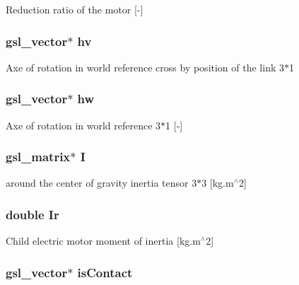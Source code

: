 Reduction ratio of the motor \mbox{[}-\/\mbox{]} \hypertarget{struct_stu_l_i_n_k_a047b5818b1f61a1ae7cf4b367fb2a351}{
\subsubsection[{hv}]{\setlength{\rightskip}{0pt plus 5cm}gsl\-\_\-vector$\ast$ hv}}\label{struct_stu_l_i_n_k_a047b5818b1f61a1ae7cf4b367fb2a351}
Axe of rotation in world reference cross by position of the link 3$\ast$1 \hypertarget{struct_stu_l_i_n_k_ad5b22cc091d474f9a72b98483e532d8a}{
\subsubsection[{hw}]{\setlength{\rightskip}{0pt plus 5cm}gsl\-\_\-vector$\ast$ hw}}\label{struct_stu_l_i_n_k_ad5b22cc091d474f9a72b98483e532d8a}
Axe of rotation in world reference 3$\ast$1 \mbox{[}-\/\mbox{]} \hypertarget{struct_stu_l_i_n_k_a20c577c90b1d497258ed3540242429f4}{
\subsubsection[{I}]{\setlength{\rightskip}{0pt plus 5cm}gsl\-\_\-matrix$\ast$ I}}\label{struct_stu_l_i_n_k_a20c577c90b1d497258ed3540242429f4}
around the center of gravity inertia tensor 3$\ast$3 \mbox{[}kg.\-m$^\wedge$2\mbox{]} \hypertarget{struct_stu_l_i_n_k_af889caeb9a167f251e3d0a7b5730eda3}{
\subsubsection[{Ir}]{\setlength{\rightskip}{0pt plus 5cm}double Ir}}\label{struct_stu_l_i_n_k_af889caeb9a167f251e3d0a7b5730eda3}
Child electric motor moment of inertia \mbox{[}kg.\-m$^\wedge$2\mbox{]} \hypertarget{struct_stu_l_i_n_k_acd521dd28fd76f6c1a1de75c85904ba4}{
\subsubsection[{is\-Contact}]{\setlength{\rightskip}{0pt plus 5cm}gsl\-\_\-vector$\ast$ is\-Contact}}\label{struct_stu_l_i_n_k_acd521dd28fd76f6c1a1de75c85904ba4}
